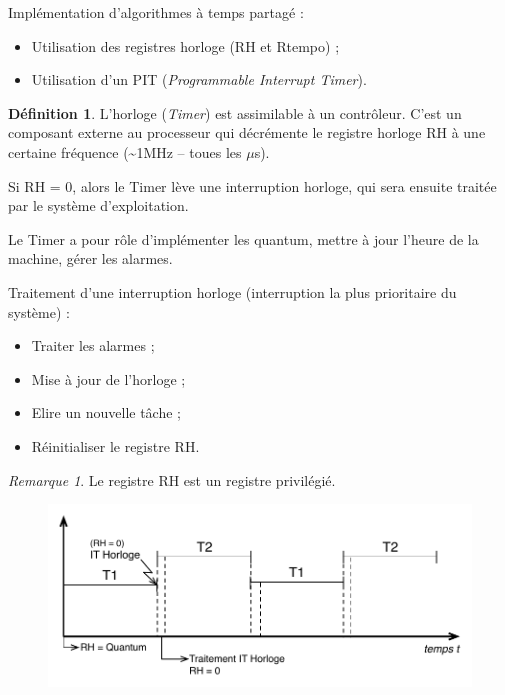 \documentclass[11pt,english,french]{scrreprt}
\theoremstyle{remark}
\newtheorem*{rem*}{Remarque}
\theoremstyle{definition}
\newtheorem*{def*}{Définition}
\begin{document}
Implémentation d'algorithmes à temps partagé :\begin{itemize}
	\item Utilisation des registres horloge (RH et Rtempo) ;
	\item Utilisation d'un PIT (\emph{Programmable Interrupt Timer}).
\end{itemize}

\begin{def*}
	L'horloge (\emph{Timer}) est assimilable à un contrôleur. C'est un composant externe au processeur qui décrémente le registre horloge RH à une certaine fréquence (\textasciitilde 1MHz -- toues les $\mu$s).
	
	Si RH = 0, alors le Timer lève une interruption horloge, qui sera ensuite traitée par le système d'exploitation.
\end{def*}

Le Timer a pour rôle d'implémenter les quantum, mettre à jour l'heure de la machine, gérer les alarmes. 

Traitement d'une interruption horloge (interruption la plus prioritaire du système) :\begin{itemize}
	\item Traiter les alarmes ;
	\item Mise à jour de l'horloge ;
	\item Elire un nouvelle tâche ;
	\item Réinitialiser le registre RH.
\end{itemize}

\begin{rem*}
	Le registre RH est un registre privilégié.
\end{rem*}

\begin{figure}[h!]
	\center
	\vspace{-20pt}
	\includegraphics[scale=.65]{img/IT-Horloge}
	\vspace{-20pt}
\end{figure}
\end{document}
